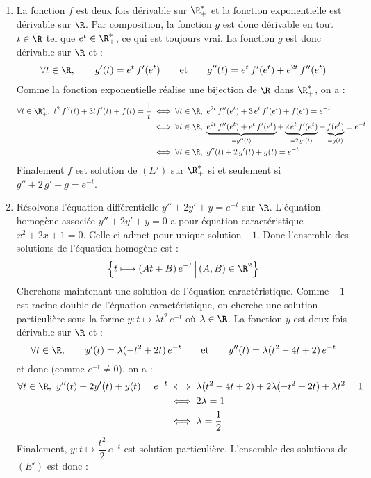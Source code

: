 \documentclass[a4paper,10pt]{report}
\begin{document}
\corr \begin{enumerate}
\item La fonction $f$ est deux fois dérivable sur $\R_+^*$ et la fonction exponentielle est dérivable sur $\R$. Par composition, la fonction $g$ est donc dérivable en tout $t\in \R$ tel que $ e^t \in \R_+^*$, ce qui est toujours vrai. La fonction $g$ est donc dérivable sur $\R$ et :
\begin{align*}
\forall t\in \R,\qquad g'(t)=e^t\,f'(e^{t})\qquad\textrm{et}\qquad g''(t)=e^{t}\,f'(e^{t})+e^{2t}\,f''(e^{t})
\end{align*}
Comme la fonction exponentielle réalise une bijection de $\R$ dans $\R_+^*$, on a :
\begin{align*}
\forall t\in \R_+^*,\ t^2\,f''(t) + 3 t f'(t)+f(t)  = \dfrac{1}{t} & \iff \forall t\in \R,\ e^{2t}\,f''(e^{t}) + 3 \,e^{t}\, f'(e^{t})+f(e^{t})  = e^{-t}\\
& \iff \forall t\in \R,\ \underbrace{e^{2t}\,f''(e^{t}) + e^{t}\,f'(e^{t})}_{=g''(t)}+\underbrace{2\,e^{t}\,f'(e^{t})}_{=2\,g'(t)}+
\underbrace{f(e^{t})}_{=g(t)}  = e^{-t}\\
&\iff \forall t\in \R,\ g''(t)+2\,g'(t)+g(t)=e^{-t}
\end{align*}
Finalement $f$ est solution de $(E')$ sur $\R_+^*$ si et seulement si $g''+2\,g'+g=e^{-t}$.
\item Résolvons l'équation différentielle $y''+2y'+y=e^{-t}$ sur $\R$. L'équation homogène associée $y''+2y'+y=0$ a pour équation caractéristique $x^2+2x+1=0$. Celle-ci admet pour unique solution $-1$. Donc l'ensemble des solutions de l'équation homogène est :
$$
\Big\{t \longmapsto (At+B)\,e^{-t}\,\Big|\,(A,B)\in \R^2\Big\}
$$
Cherchons maintenant une solution de l'équation caractéristique. Comme $-1$ est racine double de l'équation caractéristique, on cherche une solution particulière sous la forme $y : t \longmapsto \lambda t^2\,e^{-t}$ où $\lambda \in \R$. La fonction $y$ est deux fois dérivable sur $\R$ et :
$$
\forall t\in \R,\qquad y'(t)=\lambda(-t^2+2t)\,e^{-t}\qquad\textrm{et}\qquad y''(t)=\lambda(t^2-4t+2)\,e^{-t}
$$
et donc (comme $e^{-t}\ne 0$), on a :
\begin{align*}
\forall t\in \R,\ y''(t)+2y'(t)+y(t)=e^{-t}&\iff \lambda(t^2-4t+2)+2\lambda(-t^2+2t)+\lambda t^2=1\\
&\iff 2\lambda=1\\
&\iff \lambda=\dfrac{1}{2}
\end{align*}
Finalement, $y : t \longmapsto \dfrac{t^2}{2}\,e^{-t}$ est solution particulière. L'ensemble des solutions de $(E')$ est donc :

\end{enumerate}
\end{document}
